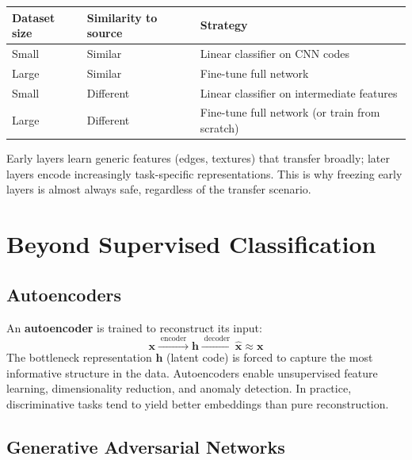 \documentclass[11pt,a4paper]{article}
\theoremstyle{definition}
\theoremstyle{plain}
\theoremstyle{remark}
\begin{document}
\begin{tcolorbox}[colback=green!5!white,colframe=green!75!black,title=\textbf{Practical Rule of Thumb}]
\begin{tabular}{lll}
    \textbf{Dataset size} & \textbf{Similarity to source} & \textbf{Strategy} \\
    \hline
    Small  & Similar   & Linear classifier on CNN codes \\
    Large  & Similar   & Fine-tune full network \\
    Small  & Different & Linear classifier on intermediate features \\
    Large  & Different & Fine-tune full network (or train from scratch) \\
\end{tabular}
\end{tcolorbox}

Early layers learn generic features (edges, textures) that transfer broadly; later layers encode increasingly task-specific representations. This is why freezing early layers is almost always safe, regardless of the transfer scenario.


\section{Beyond Supervised Classification}

\subsection{Autoencoders}

An \textbf{autoencoder} is trained to reconstruct its input:
\[
    \mathbf{x} \xrightarrow{\;\text{encoder}\;} \mathbf{h} \xrightarrow{\;\text{decoder}\;} \hat{\mathbf{x}} \approx \mathbf{x}
\]
The bottleneck representation $\mathbf{h}$ (latent code) is forced to capture the most informative structure in the data. Autoencoders enable unsupervised feature learning, dimensionality reduction, and anomaly detection. In practice, discriminative tasks tend to yield better embeddings than pure reconstruction.

\subsection{Generative Adversarial Networks}
\end{document}
